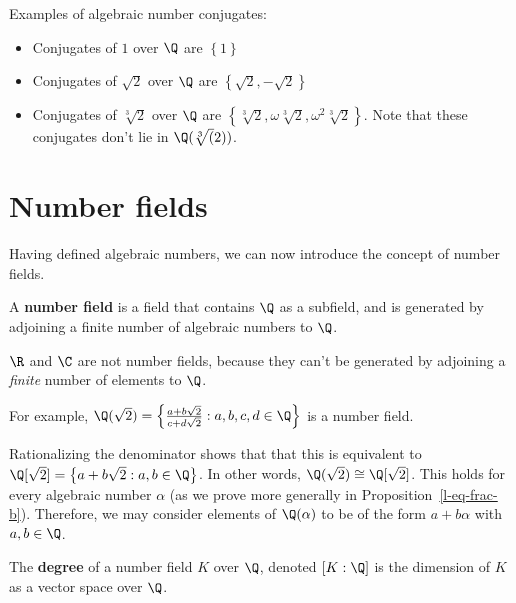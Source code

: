 \begin{ex} Examples of algebraic number conjugates:
\begin{itemize}
\item Conjugates of $1$ over $\Q$ are $\left\{1\right\}$
\item Conjugates of $\sqrt{2}$ over $\Q$ are $\left\{\sqrt{2}, -\sqrt{2}\right\}$
\item Conjugates of $\sqrt[3]{2}$ over $\Q$ are $\left\{\sqrt[3]{2}, \omega\sqrt[3]{2}, \omega^2\sqrt[3]{2}\right\}$. Note that these conjugates don't lie in $\Q(\sqrt[3](2))$.
\end{itemize}
\end{ex}

\section{Number fields}

Having defined algebraic numbers, we can now introduce the concept of number fields.

\begin{df}
A \textbf{number field} is a field that contains $\Q$ as a subfield, and is generated by adjoining a finite number of algebraic numbers to $\Q$.
\end{df}

\begin{rem}
$\R$ and $\C$ are not number fields, because they can't be generated by adjoining a \textit{finite} number of elements to $\Q$.
\end{rem}

\begin{ex}
For example, $\Q(\sqrt{2}) = \left\{\frac{a + b \sqrt{2}}{c + d \sqrt{2}} : a,b,c,d \in \Q\right\}$ is a number field.
\end{ex}

\noindent Rationalizing the denominator shows that that this is equivalent to $\Q[\sqrt{2}] = \left\{a + b \sqrt{2} : a,b \in \Q\right\}$. In other words, $\Q(\sqrt{2}) \cong \Q[\sqrt{2}]$. This holds for every algebraic number $\alpha$ (as we prove more generally in Proposition~\ref{l-eq-frac-b}). Therefore, we may consider elements of $\Q(\alpha)$ to be of the form $a + b\alpha$ with $a, b \in \Q$.

\begin{df}
The \textbf{degree} of a number field $K$ over $\Q$, denoted $[K:\Q]$ is the dimension of $K$ as a vector space over $\Q$.
\end{df}

